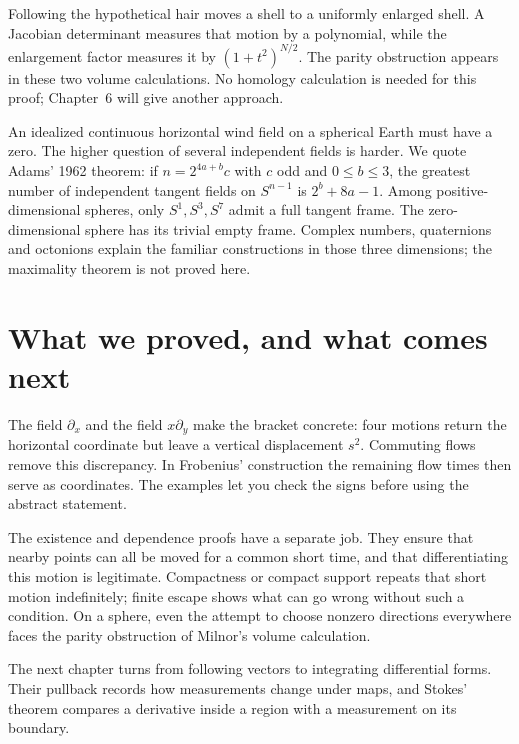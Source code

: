 \begin{beauty}
Following the hypothetical hair moves a shell to a uniformly enlarged shell. A Jacobian determinant measures that motion by a polynomial, while the enlargement factor measures it by $(1+t^2)^{N/2}$. The parity obstruction appears in these two volume calculations. No homology calculation is needed for this proof; Chapter~6 will give another approach.
\end{beauty}

\begin{remark}
An idealized continuous horizontal wind field on a spherical Earth must have a zero. The higher question of several independent fields is harder. We quote Adams' 1962 theorem: if $n=2^{4a+b}c$ with $c$ odd and $0\le b\le3$, the greatest number of independent tangent fields on $S^{n-1}$ is $2^b+8a-1$. Among positive-dimensional spheres, only $S^1,S^3,S^7$ admit a full tangent frame. The zero-dimensional sphere has its trivial empty frame. Complex numbers, quaternions and octonions explain the familiar constructions in those three dimensions; the maximality theorem is not proved here.
\end{remark}

\section{What we proved, and what comes next}

The field $\partial_x$ and the field $x\partial_y$ make the bracket concrete: four motions return the horizontal coordinate but leave a vertical displacement $s^2$. Commuting flows remove this discrepancy. In Frobenius' construction the remaining flow times then serve as coordinates. The examples let you check the signs before using the abstract statement.

The existence and dependence proofs have a separate job. They ensure that nearby points can all be moved for a common short time, and that differentiating this motion is legitimate. Compactness or compact support repeats that short motion indefinitely; finite escape shows what can go wrong without such a condition. On a sphere, even the attempt to choose nonzero directions everywhere faces the parity obstruction of Milnor's volume calculation.

The next chapter turns from following vectors to integrating differential forms. Their pullback records how measurements change under maps, and Stokes' theorem compares a derivative inside a region with a measurement on its boundary.

